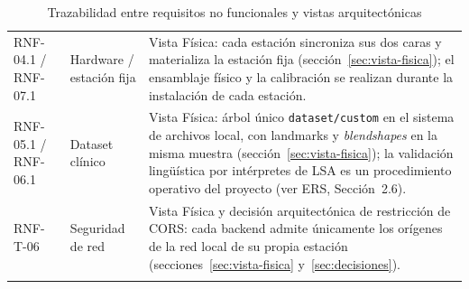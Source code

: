 \begin{longtable}{>{\raggedright\arraybackslash}p{2.3cm} >{\raggedright\arraybackslash}p{2.8cm} >{\raggedright\arraybackslash}p{8.6cm}}
    RNF-04.1 / RNF-07.1 & Hardware / estación fija &
    Vista Física: cada estación sincroniza sus dos caras y materializa la
    estación fija (sección~\ref{sec:vista-fisica}); el ensamblaje físico y
    la calibración se realizan durante la instalación de cada estación. \\

    RNF-05.1 / RNF-06.1 & Dataset clínico &
    Vista Física: árbol único \texttt{dataset/custom} en el sistema de
    archivos local, con landmarks y \textit{blendshapes} en la misma muestra
    (sección~\ref{sec:vista-fisica});
    la validación lingüística por intérpretes de LSA es un procedimiento
    operativo del proyecto (ver ERS, Sección~2.6). \\

    RNF-T-06 & Seguridad de red &
    Vista Física y decisión arquitectónica de restricción de CORS: cada
    backend admite únicamente los orígenes de la red local de su propia
    estación (secciones~\ref{sec:vista-fisica} y~\ref{sec:decisiones}). \\
    \bottomrule
    \caption{Trazabilidad entre requisitos no funcionales y vistas arquitectónicas}
    \label{tab:arq-rnf}
\end{longtable}
